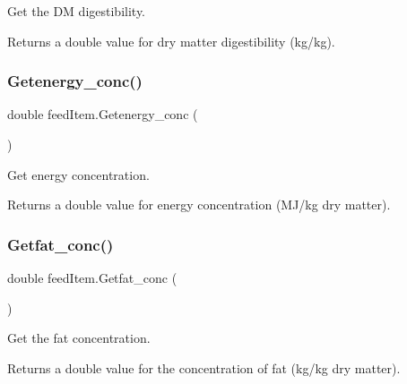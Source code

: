 Get the DM digestibility. 

\begin{DoxyReturn}{Returns}
a double value for dry matter digestibility (kg/kg). 
\end{DoxyReturn}
\mbox{\label{classfeed_item_ada32a85ac5816c09adeca9e757e666e8}} 
\subsubsection{\texorpdfstring{Getenergy\_conc()}{Getenergy\_conc()}}
{\footnotesize\ttfamily double feed\+Item.\+Getenergy\+\_\+conc (\begin{DoxyParamCaption}{ }\end{DoxyParamCaption})\hspace{0.3cm}{\ttfamily [inline]}}



Get energy concentration. 

\begin{DoxyReturn}{Returns}
a double value for energy concentration (M\+J/kg dry matter). 
\end{DoxyReturn}
\mbox{\label{classfeed_item_a691bb377b814d94f806918e8572ad59f}} 
\subsubsection{\texorpdfstring{Getfat\_conc()}{Getfat\_conc()}}
{\footnotesize\ttfamily double feed\+Item.\+Getfat\+\_\+conc (\begin{DoxyParamCaption}{ }\end{DoxyParamCaption})\hspace{0.3cm}{\ttfamily [inline]}}



Get the fat concentration. 

\begin{DoxyReturn}{Returns}
a double value for the concentration of fat (kg/kg dry matter). 
\end{DoxyReturn}
\mbox{\label{classfeed_item_a2ac9193880ba846aa5d36a440b403dd2}} 
